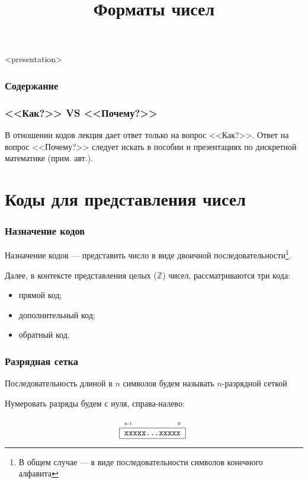 


\title[Форматы представления чисел]{Форматы чисел}

\setcounter{TaskSimpleCtr}{1}
\newcommand{\TaskSimpleNumber}{ \arabic{TaskSimpleCtr}) \addtocounter{TaskSimpleCtr}{1} }



\begin{frame}<presentation>
    \frametitle{Содержание}
    \tableofcontents
\end{frame}

\begin{frame}
    \frametitle{<<Как?>> VS <<Почему?>>}
    
    В отношении кодов лекция дает ответ только на вопрос <<Как?>>. Ответ на вопрос <<Почему?>> следует искать в пособии и презентациях по дискретной математике (прим. авт.).
\end{frame}

\section{Коды для представления чисел}

\begin{frame}
    \frametitle{Назначение кодов}

    \begin{block}{}
    Назначение кодов --- представить число в виде двоичной последовательности\footnote{В общем случае --- в виде последовательности символов конечного алфавита}.
    \end{block}
    
    Далее, в контексте представления целых ($\mathbb{Z}$) чисел, рассматриваются три кода:
    \begin{itemize}
        \item прямой код;
        \item дополнительный код;
        \item обратный код.
    \end{itemize}
\end{frame}

\begin{frame}
    \frametitle{Разрядная сетка}

    \begin{block}{}
        Последовательность длиной в $n$ символов будем называть $n$-разрядной сеткой
    \end{block}
    
    Нумеровать разряды будем с нуля, справа-налево:
    
    \[
        \UnsignedAny{n-1}{xxxxx...xxxxx}
    \]
\end{frame}

